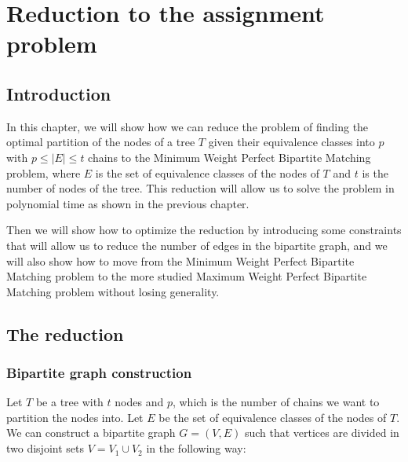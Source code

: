 \chapter{Reduction to the assignment problem}

\section{Introduction}
In this chapter, we will show how we can reduce the problem of finding the optimal partition of the nodes of a tree $T$ given their equivalence classes into $p$ with $p \leq |E| \leq t$ chains to the Minimum Weight Perfect Bipartite Matching problem, where $E$ is the set of equivalence classes of the nodes of $T$ and $t$ is the number of nodes of the tree. This reduction will allow us to solve the problem in polynomial time as shown in the previous chapter.

Then we will show how to optimize the reduction by introducing some constraints that will allow us to reduce the number of edges in the bipartite graph, and we will also show how to move from the Minimum Weight Perfect Bipartite Matching problem to the more studied Maximum Weight Perfect Bipartite Matching problem without losing generality.

\section{The reduction}
\subsection{Bipartite graph construction}
Let $T$ be a tree with $t$ nodes and $p$, which is the number of chains we want to partition the nodes into. Let $E$ be the set of equivalence classes of the nodes of $T$. We can construct a bipartite graph $G = (V, E)$ such that vertices are divided in two disjoint sets $V = V_1 \cup V_2$ in the following way:

